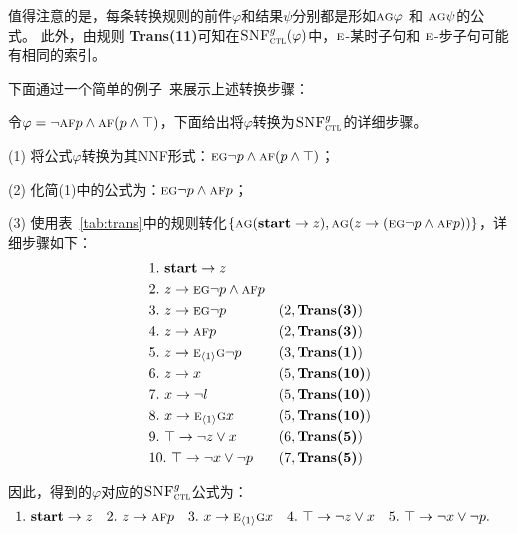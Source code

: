 值得注意的是，每条转换规则的前件$\varphi$和结果$\psi$分别都是形如$\textsc{a}\textsc{g}\varphi$ 和 $\textsc{a}\textsc{g}\psi$的公式。
此外，由规则 \textbf{Trans(11)}可知在${\textsc{SNF}_{\textsc{ctl}}^g}(\varphi)$中，$\textsc{e}$-某时子句和 $\textsc{e}$-步子句可能有相同的索引。


下面通过一个简单的例子~\cite{zhang2014resolution}来展示上述转换步骤：
\begin{example}\label{exmp:transbot}
	令$\varphi=\neg \textsc{a} \textsc{f} p \wedge \textsc{a}\textsc{f}(p \wedge \top)$，下面给出将$\varphi$转换为${\textsc{SNF}_{\textsc{ctl}}^g}$的详细步骤。
	
	(1) 将公式$\varphi$转换为其NNF形式：$\textsc{e}\textsc{g} \neg p \wedge \textsc{a}\textsc{f}(p \wedge \top)$；
	
	(2) 化简(1)中的公式为：$\textsc{e}\textsc{g} \neg p \wedge \textsc{a}\textsc{f} p$；
	
	(3) 使用表~\ref{tab:trans}中的规则转化$\{\textsc{a}\textsc{g}(\textbf{start} \rightarrow z), \textsc{a}\textsc{g}(z \rightarrow (\textsc{e}\textsc{g} \neg p \wedge \textsc{a}\textsc{f} p))\}$，详细步骤如下：
	\begin{align*}
		&1.\ \textbf{start} \rightarrow z && \\
		&2.\ z \rightarrow \textsc{e}\textsc{g} \neg p \wedge \textsc{a}\textsc{f} p &&  \\
		&3.\ z \rightarrow  \textsc{e}\textsc{g} \neg p && (2, \textbf{Trans(3)})\\
		&4.\ z \rightarrow \textsc{a}\textsc{f} p && (2, \textbf{Trans(3)})\\
		&5.\ z \rightarrow  \textsc{e}_{{\langle{1}\rangle}}\textsc{g} \neg p  && (3, \textbf{Trans(1)})\\
		&6.\ z \rightarrow x && (5, \textbf{Trans(10)})\\
		&7.\ x\rightarrow \neg l && (5, \textbf{Trans(10)})\\
		&8.\ x\rightarrow \textsc{e}_{{\langle{1}\rangle}} \textsc{g} x&& (5, \textbf{Trans(10)})\\
		&9.\ \top \rightarrow \neg z \vee x && (6, \textbf{Trans(5)}) \\
		&10.\ \top \rightarrow \neg x \vee \neg p && (7, \textbf{Trans(5)}) 
	\end{align*}

因此，得到的$\varphi$对应的${\textsc{SNF}_{\textsc{ctl}}^g}$公式为：
\begin{align*}
	&1.\ \textbf{start} \rightarrow z && 2.\ z \rightarrow \textsc{a}\textsc{f} p && 3.\ x\rightarrow \textsc{e}_{{\langle{1}\rangle}} \textsc{g} x
	&& 4.\ \top \rightarrow \neg z \vee x && 5.\ \top \rightarrow \neg x \vee \neg p.
\end{align*}
\end{example}






